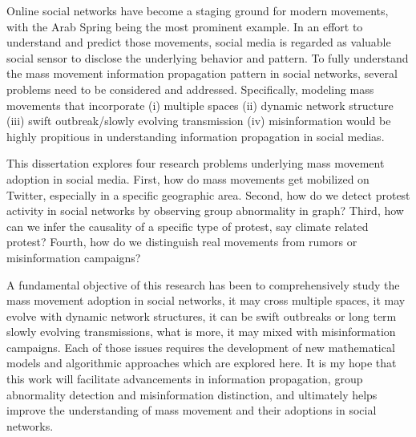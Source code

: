 \documentclass[12pt,dvips]{report}
\begin{document}
Online social networks have become a staging ground for modern movements, with the Arab
Spring being the most prominent example. In an effort to understand and predict those movements, social media is regarded as valuable social sensor to disclose the underlying behavior and pattern. To fully understand the mass movement information propagation pattern in social networks, several problems need to be considered and addressed. Specifically, modeling mass movements that incorporate (i) multiple spaces (ii) dynamic network structure (iii) swift outbreak/slowly evolving transmission (iv) misinformation would be highly propitious in understanding information propagation in social medias.

This dissertation explores four research problems underlying mass movement adoption in social media. First, how do mass movements get mobilized on Twitter, especially in a specific geographic area. Second, how do we detect protest activity in social networks by observing group abnormality in graph? Third, how can we infer the causality of a specific type of protest, say climate related protest? Fourth, how do we distinguish real movements from rumors or misinformation campaigns?

A fundamental objective of this research has been to comprehensively study the mass movement adoption in social networks, it may cross multiple spaces, it may evolve with dynamic network structures, it can be swift outbreaks or long term slowly evolving transmissions, what is more, it may mixed with misinformation campaigns. Each of those issues requires the development of new mathematical models and algorithmic approaches which are explored here.  It is my hope that this work will facilitate advancements in information propagation, group abnormality detection and misinformation distinction, and ultimately helps improve the understanding of mass movement and their adoptions in social networks.

\end{document}
